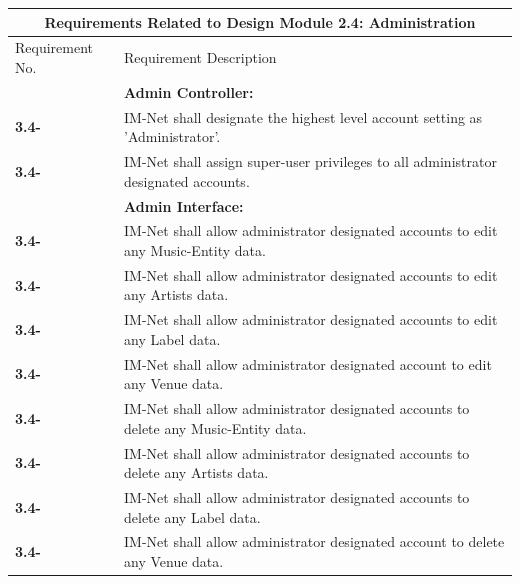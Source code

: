 \documentclass[letterpaper,12pt]{article}
\newcounter{rcounter}						%
\newcommand\rnumber{\stepcounter{rcounter}\arabic{rcounter}}
\begin{document}
{\begin{center}
\begin{tabular}{|l|p{6in}|}
\end{tabular} 
\end{center}

\setcounter{rcounter}{0}
\begin{center}
\begin{tabular}{|l|p{6in}|}
\hline 
\multicolumn{2}{|c|}{\textbf{Requirements Related to Design Module 2.4: Administration}} \\ 
\hline 
Requirement No. & Requirement Description \\ 
\hline
& \textbf{Admin Controller:} \\
\hline
\textbf{3.4-\rnumber} & IM-Net shall designate the highest level account setting as 'Administrator'. \\ 
\hline
\textbf{3.4-\rnumber} & IM-Net shall assign super-user privileges to all administrator designated accounts. \\ 
\hline 
& \textbf{Admin Interface:} \\
\hline
\textbf{3.4-\rnumber} & IM-Net shall allow administrator designated accounts to edit any Music-Entity data. \\ 
\hline 
\textbf{3.4-\rnumber} & IM-Net shall allow administrator designated accounts to edit any Artists data. \\ 
\hline 
\textbf{3.4-\rnumber} & IM-Net shall allow administrator designated accounts to edit any Label data. \\ 
\hline 
\textbf{3.4-\rnumber} & IM-Net shall allow administrator designated account to edit any Venue data. \\ 
\hline
\textbf{3.4-\rnumber} & IM-Net shall allow administrator designated accounts to delete any Music-Entity data. \\ 
\hline 
\textbf{3.4-\rnumber} & IM-Net shall allow administrator designated accounts to delete any Artists data. \\ 
\hline 
\textbf{3.4-\rnumber} & IM-Net shall allow administrator designated accounts to delete any Label data. \\ 
\hline 
\textbf{3.4-\rnumber} & IM-Net shall allow administrator designated account to delete any Venue data. \\ 
\hline


\end{tabular}
\end{center}}
\end{document}
